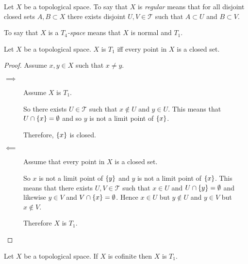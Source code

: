 \documentclass[letterpaper,12pt,fleqn]{article}
\newcommand{\T}{\mathscr{T}}
\begin{document}
\begin{definition}[Normal]
  Let \(X\) be a topological space.  To say that \(X\) is \emph{regular} means that for all disjoint closed sets
  \(A,B\subset X\) there exists disjoint \(U,V\in\T\) such that \(A\subset U\) and \(B\subset V\).
  \begin{center}
  \end{center}
  To say that \(X\) is a \(T_4\)\emph{-space} means that \(X\) is normal and \(T_1\).
\end{definition}

\begin{theorem}
  Let \(X\) be a topological space.  \(X\) is \(T_1\) iff every point in \(X\) is a closed set.
\end{theorem}

\begin{proof}
  Assume \(x,y\in X\) such that \(x\ne y\).

  \begin{description}
  \item[\(\implies\)] Assume \(X\) is \(T_1\).

    So there exists \(U\in\T\) such that \(x\notin U\) and \(y\in U\).  This means that \(U\cap\{x\}=\emptyset\)
    and so \(y\) is not a limit point of \(\{x\}\).

    Therefore, \(\{x\}\) is closed.

  \item[\(\impliedby\)] Assume that every point in \(X\) is a closed set.

    So \(x\) is not a limit point of \(\{y\}\) and \(y\) is not a limit point of \(\{x\}\).  This means that
    there exists \(U,V\in\T\) such that \(x\in U\) and \(U\cap\{y\}=\emptyset\) and likewise \(y\in V\) and
    \(V\cap\{x\}=\emptyset\).  Hence \(x\in U\) but \(y\notin U\) and \(y\in V\) but \(x\notin V\).

    Therefore \(X\) is \(T_1\).
  \end{description}
\end{proof}

\begin{theorem}
  Let \(X\) be a topological space.  If \(X\) is cofinite then \(X\) is \(T_1\).
\end{theorem}
\end{document}
